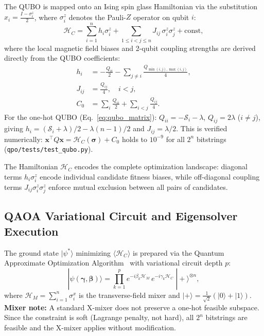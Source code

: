\documentclass[11pt,a4paper]{article}
\begin{document}
The QUBO is mapped onto an Ising spin glass Hamiltonian via the substitution $x_i = \frac{I - \sigma_i^z}{2}$, where $\sigma_i^z$ denotes the Pauli-$Z$ operator on qubit $i$:
\begin{equation}
\mathcal{H}_C = \sum_{i=1}^n h_i \sigma_i^z + \sum_{1 \le i < j \le n} J_{ij}\, \sigma_i^z \sigma_j^z + \text{const},
\label{eq:ising}
\end{equation}
where the local magnetic field biases and 2-qubit coupling strengths are derived directly from the QUBO coefficients:
\begin{align}
h_i &= -\frac{Q_{ii}}{2} - \sum_{j \ne i} \frac{Q_{\min(i,j),\max(i,j)}}{4}, \label{eq:h_coeff}\\
J_{ij} &= \frac{Q_{ij}}{4}, \quad i < j, \label{eq:J_coeff}\\
C_0 &= \sum_i \frac{Q_{ii}}{2} + \sum_{i<j} \frac{Q_{ij}}{4}. \label{eq:const_coeff}
\end{align}
For the one-hot QUBO (Eq.~\ref{eq:qubo_matrix}): $Q_{ii} = -\mathcal{S}_i - \lambda$, $Q_{ij} = 2\lambda$ ($i\ne j$), giving $h_i = (\mathcal{S}_i + \lambda)/2 - \lambda(n-1)/2$ and $J_{ij} = \lambda/2$. This is verified numerically: $\mathbf{x}^\top Q\mathbf{x} = \mathcal{H}_C(\boldsymbol{\sigma}) + C_0$ holds to $10^{-9}$ for all $2^n$ bitstrings (\texttt{qpo/tests/test\_qubo.py}).

The Hamiltonian $\mathcal{H}_C$ encodes the complete optimization landscape: diagonal terms $h_i \sigma_i^z$ encode individual candidate fitness biases, while off-diagonal coupling terms $J_{ij} \sigma_i^z \sigma_j^z$ enforce mutual exclusion between all pairs of candidates.

\subsection{QAOA Variational Circuit and Eigensolver Execution}
\label{subsec:qaoa}

The ground state $|\psi^*\rangle$ minimizing $\langle \mathcal{H}_C \rangle$ is prepared via the Quantum Approximate Optimization Algorithm~\cite{farhi2014quantum} with variational circuit depth $p$:
\begin{equation}
|\psi(\boldsymbol{\gamma}, \boldsymbol{\beta})\rangle = \prod_{k=1}^p e^{-i\beta_k \mathcal{H}_M}\, e^{-i\gamma_k \mathcal{H}_C}\; |{+}\rangle^{\otimes n},
\label{eq:qaoa}
\end{equation}
where $\mathcal{H}_M = \sum_{i=1}^n \sigma_i^x$ is the transverse-field mixer and $|{+}\rangle = \frac{1}{\sqrt{2}}(|0\rangle + |1\rangle)$. \textbf{Mixer note:} A standard X-mixer does not preserve a one-hot feasible subspace. Since the constraint is soft (Lagrange penalty, not hard), all $2^n$ bitstrings are feasible and the X-mixer applies without modification.
\end{document}
